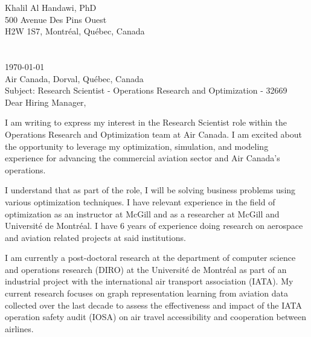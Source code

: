 \documentclass[12pt]{article} %
\begin{document}

Khalil Al Handawi, PhD\\
500 Avenue Des Pins Ouest\\
H2W 1S7, Montr\'{e}al, Qu\'{e}bec, Canada\\
\faPhone~~\cvnumberphone\\
\faEnvelope~~\href{mailto:\cvmail}{\cvmail}\\

\today\\

Air Canada, Dorval, Qu\'{e}bec, Canada\\
Subject: Research Scientist - Operations Research and Optimization - 32669\\[6pt]


Dear Hiring Manager,

\medskip %

I am writing to express my interest in the Research Scientist role within the Operations Research and Optimization team at Air Canada. I am excited about the opportunity to leverage my optimization, simulation, and modeling experience for advancing the commercial aviation sector and Air Canada's operations.

\medskip %

I understand that as part of the role, I will be solving business problems using various optimization techniques. I have relevant experience in the field of optimization as an instructor at McGill and as a researcher at McGill and Universit\'{e} de Montr\'{e}al. I have 6 years of experience doing research on aerospace and aviation related projects at said institutions.

I am currently a post-doctoral research at the department of computer science and operations research (DIRO) at the Universit\'{e} de Montr\'{e}al as part of an industrial project with the international air transport association (IATA). My current research focuses on graph representation learning from aviation data collected over the last decade to assess the effectiveness and impact of the IATA operation safety audit (IOSA) on air travel accessibility and cooperation between airlines. 
\end{document}

